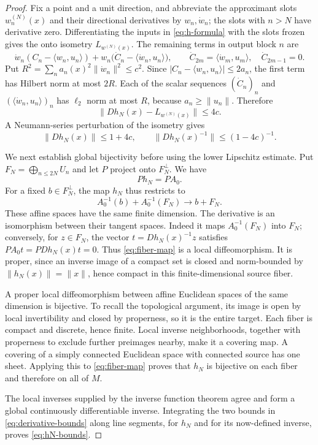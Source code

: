 \begin{proof}
Fix a point and a unit direction, and abbreviate the approximant slots
$w_n^{(N)}(x)$ and their directional derivatives by $w_n,\dot w_n$;
the slots with $n>N$ have derivative zero. Differentiating the inputs in
\eqref{eq:h-formula} with the slots frozen gives the onto isometry
$L_{w^{(N)}(x)}$. The remaining terms in output block $n$ are
\[
 \dot w_n(C_n-\langle w_n,u_n\rangle)
 +w_n\bigl(\dot C_n-\langle\dot w_n,u_n\rangle\bigr),
 \qquad
 \dot C_{2m}=\langle\dot w_m,u_m\rangle,
 \quad \dot C_{2m-1}=0.
\]
Put $R^2=\sum_n a_n(x)^2\|\dot w_n\|^2\le c^2$. Since
$|C_n-\langle w_n,u_n\rangle|\le2a_n$, the first term has
Hilbert norm at most $2R$. Each of the scalar sequences
$(\dot C_n)_n$ and $(\langle\dot w_n,u_n\rangle)_n$ has
$\ell_2$ norm at most $R$, because $a_n\ge\|u_n\|$.
Therefore
\begin{equation}
\label{eq:derivative-perturbation}
 \|Dh_N(x)-L_{w^{(N)}(x)}\|\le4c.
\end{equation}
A Neumann-series perturbation of the isometry gives
\begin{equation}
\label{eq:derivative-bounds}
 \|Dh_N(x)\|\le1+4c,
 \qquad \|Dh_N(x)^{-1}\|\le(1-4c)^{-1}.
\end{equation}

We next establish global bijectivity before using the lower
Lipschitz estimate. Put $F_N=\bigoplus_{n\le2N}U_n$ and let $P$
project onto $F_N^\perp$. We have
\[
 Ph_N=PA_0.
\]
For a fixed $b\in F_N^\perp$, the map $h_N$ thus restricts to
\begin{equation}
\label{eq:fiber-map}
 A_0^{-1}(b)+A_0^{-1}(F_N)\longrightarrow b+F_N.
\end{equation}
These affine spaces have the same finite dimension. The derivative
is an isomorphism between their tangent spaces. Indeed it maps
$A_0^{-1}(F_N)$ into $F_N$; conversely, for $z\in F_N$, the vector
$t=Dh_N(x)^{-1}z$ satisfies
$PA_0t=PDh_N(x)t=0$. Thus \eqref{eq:fiber-map} is a local
diffeomorphism. It is proper, since an inverse image of a compact
set is closed and norm-bounded by $\|h_N(x)\|=\|x\|$, hence compact
in this finite-dimensional source fiber.

A proper local diffeomorphism between affine Euclidean spaces of
the same dimension is bijective. To recall the topological argument,
its image is open by local invertibility and closed by properness,
so it is the entire target. Each fiber is compact and discrete,
hence finite. Local inverse neighborhoods, together with properness
to exclude further preimages nearby, make it a covering map. A
covering of a simply connected Euclidean space with connected
source has one sheet. Applying this to \eqref{eq:fiber-map} proves
that $h_N$ is bijective on each fiber and therefore on all of $M$.

The local inverses supplied by the inverse function theorem agree
and form a global continuously differentiable inverse. Integrating
the two bounds in \eqref{eq:derivative-bounds} along line segments,
for $h_N$ and for its now-defined inverse, proves
\eqref{eq:hN-bounds}.
\end{proof}

